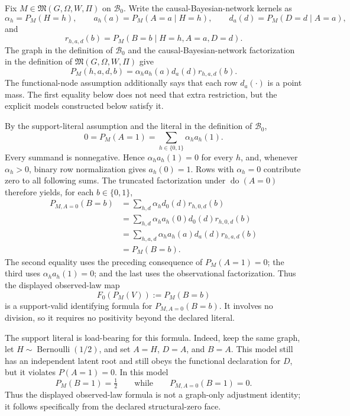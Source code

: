 Fix \(M\in\mathfrak M(G,\Omega,W,\Pi)\) on \(\mathcal B_0\).  Write the causal-Bayesian-network kernels as
\[
 \alpha_h=P_M(H=h),\qquad
 a_h(a)=P_M(A=a\mid H=h),\qquad
 d_a(d)=P_M(D=d\mid A=a),
\]
and
\[
 r_{h,a,d}(b)=P_M(B=b\mid H=h,A=a,D=d).
\]
The graph in the definition of \(\mathcal B_0\) and the causal-Bayesian-network factorization in the definition of \(\mathfrak M(G,\Omega,W,\Pi)\) give
\[
 P_M(h,a,d,b)=\alpha_h a_h(a)d_a(d)r_{h,a,d}(b).
\]
The functional-node assumption additionally says that each row \(d_a(\cdot)\) is a point mass.  The first equality below does not need that extra restriction, but the explicit models constructed below satisfy it.

By the support-literal assumption and the literal in the definition of \(\mathcal B_0\),
\[
 0=P_M(A=1)=\sum_{h\in\{0,1\}}\alpha_h a_h(1).
\]
Every summand is nonnegative.  Hence \(\alpha_h a_h(1)=0\) for every \(h\), and, whenever \(\alpha_h>0\), binary row normalization gives \(a_h(0)=1\).  Rows with \(\alpha_h=0\) contribute zero to all following sums.  The truncated factorization under \(\operatorname{do}(A=0)\) therefore yields, for each \(b\in\{0,1\}\),
\[
\begin{aligned}
 P_{M,A=0}(B=b)
 &=\sum_{h,d}\alpha_h d_0(d)r_{h,0,d}(b)\\
 &=\sum_{h,d}\alpha_h a_h(0)d_0(d)r_{h,0,d}(b)\\
 &=\sum_{h,a,d}\alpha_h a_h(a)d_a(d)r_{h,a,d}(b)\\
 &=P_M(B=b).
\end{aligned}
\]
The second equality uses the preceding consequence of \(P_M(A=1)=0\); the third uses \(\alpha_h a_h(1)=0\); and the last uses the observational factorization.  Thus the displayed observed-law map
\[
 F_0(P_M(V)):=P_M(B=b)
\]
is a support-valid identifying formula for \(P_{M,A=0}(B=b)\).  It involves no division, so it requires no positivity beyond the declared literal.

The support literal is load-bearing for this formula.  Indeed, keep the same graph, let \(H\sim\operatorname{Bernoulli}(1/2)\), and set \(A=H\), \(D=A\), and \(B=A\).  This model still has an independent latent root and still obeys the functional declaration for \(D\), but it violates \(P(A=1)=0\).  In this model
\[
 P_M(B=1)=\tfrac12
 \qquad\text{while}\qquad
 P_{M,A=0}(B=1)=0.
\]
Thus the displayed observed-law formula is not a graph-only adjustment identity; it follows specifically from the declared structural-zero face.

